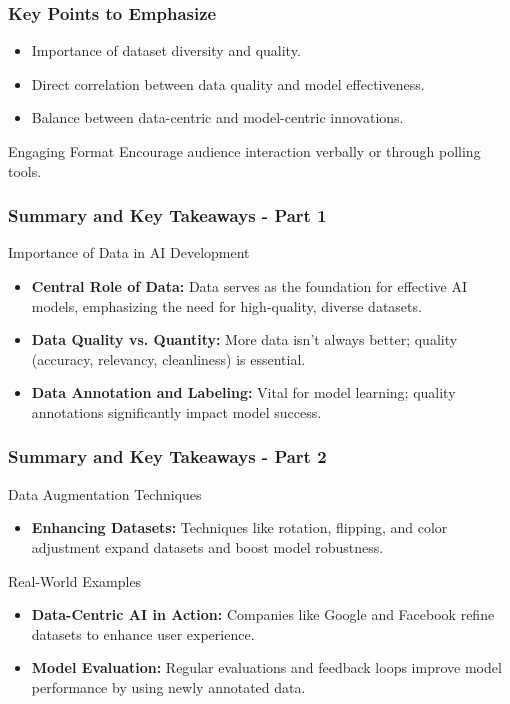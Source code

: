 \documentclass[aspectratio=169]{beamer}
\begin{document}
\begin{frame}[fragile]
    \frametitle{Key Points to Emphasize}
    \begin{itemize}
        \item Importance of dataset diversity and quality.
        \item Direct correlation between data quality and model effectiveness.
        \item Balance between data-centric and model-centric innovations.
    \end{itemize}
    \begin{block}{Engaging Format}
        Encourage audience interaction verbally or through polling tools.
    \end{block}
\end{frame}

\begin{frame}[fragile]
    \frametitle{Summary and Key Takeaways - Part 1}
    \begin{block}{Importance of Data in AI Development}
        \begin{itemize}
            \item \textbf{Central Role of Data:} Data serves as the foundation for effective AI models, emphasizing the need for high-quality, diverse datasets.
            \item \textbf{Data Quality vs. Quantity:} More data isn't always better; quality (accuracy, relevancy, cleanliness) is essential.
            \item \textbf{Data Annotation and Labeling:} Vital for model learning; quality annotations significantly impact model success.
        \end{itemize}
    \end{block}
\end{frame}

\begin{frame}[fragile]
    \frametitle{Summary and Key Takeaways - Part 2}
    \begin{block}{Data Augmentation Techniques}
        \begin{itemize}
            \item \textbf{Enhancing Datasets:} Techniques like rotation, flipping, and color adjustment expand datasets and boost model robustness.
        \end{itemize}
    \end{block}
    
    \begin{block}{Real-World Examples}
        \begin{itemize}
            \item \textbf{Data-Centric AI in Action:} Companies like Google and Facebook refine datasets to enhance user experience.
            \item \textbf{Model Evaluation:} Regular evaluations and feedback loops improve model performance by using newly annotated data.
        \end{itemize}
    \end{block}
\end{frame}
\end{document}
